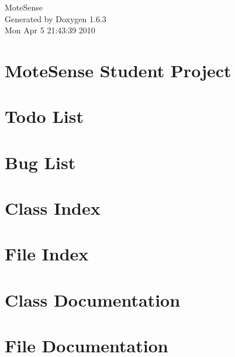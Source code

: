 \documentclass[a4paper]{book}
\begin{document}
\hypersetup{pageanchor=false}
\begin{titlepage}
\vspace*{7cm}
\begin{center}
{\Large MoteSense }\\
\vspace*{1cm}
{\large Generated by Doxygen 1.6.3}\\
\vspace*{0.5cm}
{\small Mon Apr 5 21:43:39 2010}\\
\end{center}
\end{titlepage}
\clearemptydoublepage
{}
\tableofcontents
\clearemptydoublepage
{}
\hypersetup{pageanchor=true}
\chapter{MoteSense Student Project}
\label{index}\hypertarget{index}{}
\chapter{Todo List}
\label{todo}
\hypertarget{todo}{}

\chapter{Bug List}
\label{bug}
\hypertarget{bug}{}

\chapter{Class Index}

\chapter{File Index}

\chapter{Class Documentation}






\chapter{File Documentation}













\printindex
\end{document}
